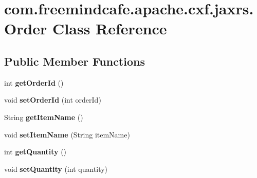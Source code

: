 \hypertarget{classcom_1_1freemindcafe_1_1apache_1_1cxf_1_1jaxrs_1_1_order}{}\section{com.\+freemindcafe.\+apache.\+cxf.\+jaxrs.\+Order Class Reference}
\label{classcom_1_1freemindcafe_1_1apache_1_1cxf_1_1jaxrs_1_1_order}
\subsection*{Public Member Functions}
\begin{DoxyCompactItemize}
\item 
\hypertarget{classcom_1_1freemindcafe_1_1apache_1_1cxf_1_1jaxrs_1_1_order_ab92d0b307457b53cfeb4877116a7cec3}{}int {\bfseries get\+Order\+Id} ()\label{classcom_1_1freemindcafe_1_1apache_1_1cxf_1_1jaxrs_1_1_order_ab92d0b307457b53cfeb4877116a7cec3}

\item 
\hypertarget{classcom_1_1freemindcafe_1_1apache_1_1cxf_1_1jaxrs_1_1_order_a7d14c4d5cc75204c636963a75c7aceb7}{}void {\bfseries set\+Order\+Id} (int order\+Id)\label{classcom_1_1freemindcafe_1_1apache_1_1cxf_1_1jaxrs_1_1_order_a7d14c4d5cc75204c636963a75c7aceb7}

\item 
\hypertarget{classcom_1_1freemindcafe_1_1apache_1_1cxf_1_1jaxrs_1_1_order_a2b38d290f287ddb1abc7c56832fea564}{}String {\bfseries get\+Item\+Name} ()\label{classcom_1_1freemindcafe_1_1apache_1_1cxf_1_1jaxrs_1_1_order_a2b38d290f287ddb1abc7c56832fea564}

\item 
\hypertarget{classcom_1_1freemindcafe_1_1apache_1_1cxf_1_1jaxrs_1_1_order_af167e45aab042a20a419addfc021e6c3}{}void {\bfseries set\+Item\+Name} (String item\+Name)\label{classcom_1_1freemindcafe_1_1apache_1_1cxf_1_1jaxrs_1_1_order_af167e45aab042a20a419addfc021e6c3}

\item 
\hypertarget{classcom_1_1freemindcafe_1_1apache_1_1cxf_1_1jaxrs_1_1_order_a0371a566caa993aee336f6276b250e85}{}int {\bfseries get\+Quantity} ()\label{classcom_1_1freemindcafe_1_1apache_1_1cxf_1_1jaxrs_1_1_order_a0371a566caa993aee336f6276b250e85}

\item 
\hypertarget{classcom_1_1freemindcafe_1_1apache_1_1cxf_1_1jaxrs_1_1_order_a0f84777b8d23ec7e2d0273149063af86}{}void {\bfseries set\+Quantity} (int quantity)\label{classcom_1_1freemindcafe_1_1apache_1_1cxf_1_1jaxrs_1_1_order_a0f84777b8d23ec7e2d0273149063af86}


\end{DoxyCompactItemize}
